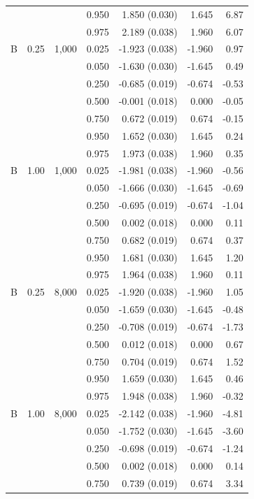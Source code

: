 \begin{tabular}{lrrrrrr}
 &  &  & 0.950 & 1.850 (0.030) & 1.645 & 6.87 \\
 &  &  & 0.975 & 2.189 (0.038) & 1.960 & 6.07 \\
\addlinespace
B & 0.25 & 1,000 & 0.025 & -1.923 (0.038) & -1.960 & 0.97 \\
 &  &  & 0.050 & -1.630 (0.030) & -1.645 & 0.49 \\
 &  &  & 0.250 & -0.685 (0.019) & -0.674 & -0.53 \\
 &  &  & 0.500 & -0.001 (0.018) & 0.000 & -0.05 \\
 &  &  & 0.750 & 0.672 (0.019) & 0.674 & -0.15 \\
 &  &  & 0.950 & 1.652 (0.030) & 1.645 & 0.24 \\
 &  &  & 0.975 & 1.973 (0.038) & 1.960 & 0.35 \\
\addlinespace
B & 1.00 & 1,000 & 0.025 & -1.981 (0.038) & -1.960 & -0.56 \\
 &  &  & 0.050 & -1.666 (0.030) & -1.645 & -0.69 \\
 &  &  & 0.250 & -0.695 (0.019) & -0.674 & -1.04 \\
 &  &  & 0.500 & 0.002 (0.018) & 0.000 & 0.11 \\
 &  &  & 0.750 & 0.682 (0.019) & 0.674 & 0.37 \\
 &  &  & 0.950 & 1.681 (0.030) & 1.645 & 1.20 \\
 &  &  & 0.975 & 1.964 (0.038) & 1.960 & 0.11 \\
\addlinespace
B & 0.25 & 8,000 & 0.025 & -1.920 (0.038) & -1.960 & 1.05 \\
 &  &  & 0.050 & -1.659 (0.030) & -1.645 & -0.48 \\
 &  &  & 0.250 & -0.708 (0.019) & -0.674 & -1.73 \\
 &  &  & 0.500 & 0.012 (0.018) & 0.000 & 0.67 \\
 &  &  & 0.750 & 0.704 (0.019) & 0.674 & 1.52 \\
 &  &  & 0.950 & 1.659 (0.030) & 1.645 & 0.46 \\
 &  &  & 0.975 & 1.948 (0.038) & 1.960 & -0.32 \\
\addlinespace
B & 1.00 & 8,000 & 0.025 & -2.142 (0.038) & -1.960 & -4.81 \\
 &  &  & 0.050 & -1.752 (0.030) & -1.645 & -3.60 \\
 &  &  & 0.250 & -0.698 (0.019) & -0.674 & -1.24 \\
 &  &  & 0.500 & 0.002 (0.018) & 0.000 & 0.14 \\
 &  &  & 0.750 & 0.739 (0.019) & 0.674 & 3.34 \\

\end{tabular}
